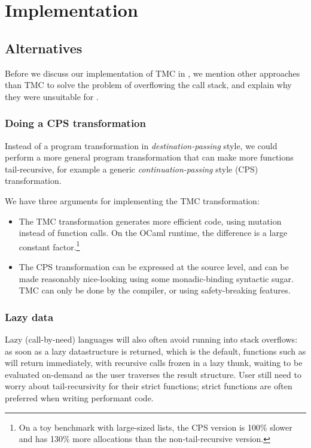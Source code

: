 \section{\OCaml Implementation}
\label{sec:implementation}

\subsection{Alternatives}

Before we discuss our implementation of TMC in \OCaml, we mention other approaches than TMC to solve the problem of overflowing the call stack, and explain why they were unsuitable for \OCaml.

\subsubsection{Doing a CPS transformation}

Instead of a program transformation in \emph{destination-passing} style, we could perform a more general program transformation that can make more functions tail-recursive, for example a generic \emph{continuation-passing} style (CPS) transformation.

We have three arguments for implementing the TMC transformation:
\begin{itemize}
\item The TMC transformation generates more efficient code, using mutation instead of function calls. On the OCaml runtime, the difference is a large constant factor.\footnote{On a toy benchmark with large-sized lists, the CPS version is 100\% slower and has 130\% more allocations than the non-tail-recursive version.}

\item The CPS transformation can be expressed at the source level, and can be made reasonably nice-looking using some monadic-binding syntactic sugar. TMC can only be done by the compiler, or using safety-breaking features.
\end{itemize}

\subsubsection{Lazy data}

Lazy (call-by-need) languages will also often avoid running into stack overflows: as soon as a lazy datastructure is returned, which is the default, functions such as  will return immediately, with recursive calls frozen in a lazy thunk, waiting to be evaluated on-demand as the user traverses the result structure.
User still need to worry about tail-recursivity for their strict functions; strict functions are often preferred when writing performant code.

